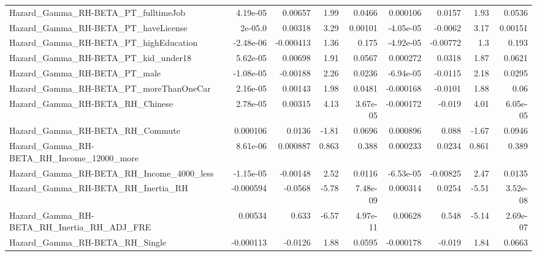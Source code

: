 \begin{tabular}{lrrrrrrrr}
Hazard\_Gamma\_RH-BETA\_PT\_fulltimeJob                &    4.19e-05 &      0.00657 &     1.99 &   0.0466 &   0.000106 &      0.0157 &         1.93 &        0.0536 \\
Hazard\_Gamma\_RH-BETA\_PT\_haveLicense                &     2e-05.0 &      0.00318 &     3.29 &  0.00101 &  -4.05e-05 &     -0.0062 &         3.17 &       0.00151 \\
Hazard\_Gamma\_RH-BETA\_PT\_highEducation              &   -2.48e-06 &    -0.000413 &     1.36 &    0.175 &  -4.92e-05 &    -0.00772 &          1.3 &         0.193 \\
Hazard\_Gamma\_RH-BETA\_PT\_kid\_under18                &    5.62e-05 &      0.00698 &     1.91 &   0.0567 &   0.000272 &      0.0318 &         1.87 &        0.0621 \\
Hazard\_Gamma\_RH-BETA\_PT\_male                       &   -1.08e-05 &     -0.00188 &     2.26 &   0.0236 &  -6.94e-05 &     -0.0115 &         2.18 &        0.0295 \\
Hazard\_Gamma\_RH-BETA\_PT\_moreThanOneCar             &    2.16e-05 &      0.00143 &     1.98 &   0.0481 &  -0.000168 &     -0.0101 &         1.88 &          0.06 \\
Hazard\_Gamma\_RH-BETA\_RH\_Chinese                    &    2.78e-05 &      0.00315 &     4.13 & 3.67e-05 &  -0.000172 &      -0.019 &         4.01 &      6.05e-05 \\
Hazard\_Gamma\_RH-BETA\_RH\_Commute                    &    0.000106 &       0.0136 &    -1.81 &   0.0696 &   0.000896 &       0.088 &        -1.67 &        0.0946 \\
Hazard\_Gamma\_RH-BETA\_RH\_Income\_12000\_more          &    8.61e-06 &     0.000887 &    0.863 &    0.388 &   0.000233 &      0.0234 &        0.861 &         0.389 \\
Hazard\_Gamma\_RH-BETA\_RH\_Income\_4000\_less           &   -1.15e-05 &     -0.00148 &     2.52 &   0.0116 &  -6.53e-05 &    -0.00825 &         2.47 &        0.0135 \\
Hazard\_Gamma\_RH-BETA\_RH\_Inertia\_RH                 &   -0.000594 &      -0.0568 &    -5.78 & 7.48e-09 &   0.000314 &      0.0254 &        -5.51 &      3.52e-08 \\
Hazard\_Gamma\_RH-BETA\_RH\_Inertia\_RH\_ADJ\_FRE         &     0.00534 &        0.633 &    -6.57 & 4.97e-11 &    0.00628 &       0.548 &        -5.14 &      2.69e-07 \\
Hazard\_Gamma\_RH-BETA\_RH\_Single                     &   -0.000113 &      -0.0126 &     1.88 &   0.0595 &  -0.000178 &      -0.019 &         1.84 &        0.0663 \\

\end{tabular}
